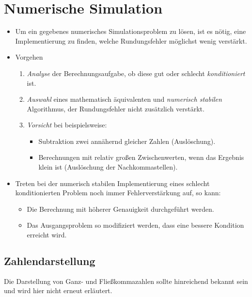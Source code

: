 \documentclass[a4paper, 11pt, accentcolor = tud3b]{tudreport}
\begin{document}
    \chapter{Numerische Simulation} %
	    \label{c:numerische_simulation}
    
        \begin{itemize}
        	\item Um ein gegebenes numerisches Simulationsproblem zu lösen, ist es nötig, eine Implementierung zu finden, welche Rundungsfehler möglichst wenig verstärkt.
        	\item Vorgehen
	        	\begin{enumerate}
	        		\item \textit{Analyse} der Berechnungsaufgabe, ob diese gut oder schlecht \textit{konditioniert} ist.
	        		\item \textit{Auswahl} eines mathematisch äquivalenten und \textit{numerisch stabilen} Algorithmus, der Rundungsfehler nicht zusätzlich verstärkt.
	        		\item \textit{Vorsicht} bei beispielsweise:
		        		\begin{itemize}
		        			\item Subtraktion zwei annähernd gleicher Zahlen (Auslöschung).
		        			\item Berechnungen mit relativ großen Zwischenwerten, wenn das Ergebnis klein ist (Auslöschung der Nachkommastellen).
		        		\end{itemize}
	        	\end{enumerate}
	        \item Treten bei der numerisch stabilen Implementierung eines schlecht konditionierten Problem noch immer Fehlerverstärkung auf, so kann:
		        \begin{itemize}
		        	\item Die Berechnung mit höherer Genauigkeit durchgeführt werden.
		        	\item Das Ausgangsproblem so modifiziert werden, dass eine bessere Kondition erreicht wird.
		        \end{itemize}
        \end{itemize}

        \section{Zahlendarstellung} %
            Die Darstellung von Ganz- und Fließkommazahlen sollte hinreichend bekannt sein und wird hier nicht erneut erläutert.
            
\end{document}
